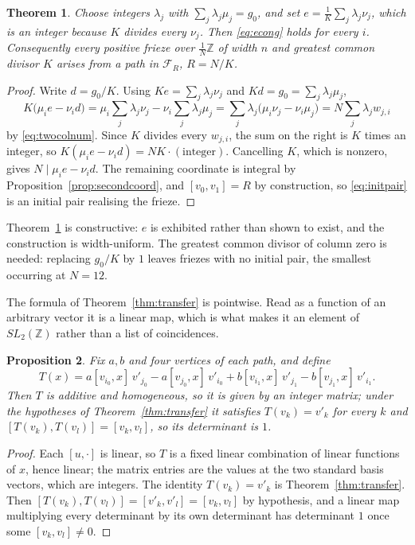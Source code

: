 \documentclass[11pt]{article}
\theoremstyle{plain}
\newtheorem{theorem}{Theorem}[section]
\newtheorem{proposition}[theorem]{Proposition}
\theoremstyle{definition}
\newcommand{\Z}{\mathbb{Z}}
\newcommand{\lat}{\tfrac{1}{N}\Z}
\begin{document}
\begin{theorem}\label{thm:initpair}
Choose integers $\lambda_j$ with $\sum_j\lambda_j\mu_j=g_0$, and set
$e=\tfrac1K\sum_j\lambda_j\nu_j$, which is an integer because $K$ divides every $\nu_j$.
Then \eqref{eq:econg} holds for every $i$. Consequently every positive frieze over $\lat$ of
width $n$ and greatest common divisor $K$ arises from a path in $\mathcal F_R$, $R=N/K$.
\end{theorem}

\begin{proof}
Write $d=g_0/K$. Using $Ke=\sum_j\lambda_j\nu_j$ and $Kd=g_0=\sum_j\lambda_j\mu_j$,
\[
  K\bigl(\mu_ie-\nu_id\bigr)
    =\mu_i\sum_j\lambda_j\nu_j-\nu_i\sum_j\lambda_j\mu_j
    =\sum_j\lambda_j\bigl(\mu_i\nu_j-\nu_i\mu_j\bigr)
    =N\sum_j\lambda_jw_{j,i}
\]
by \eqref{eq:twocolnum}. Since $K$ divides every $w_{j,i}$, the sum on the right is $K$ times
an integer, so $K(\mu_ie-\nu_id)=NK\cdot(\text{integer})$. Cancelling $K$, which is nonzero,
gives $N\mid\mu_ie-\nu_id$. The remaining coordinate is integral by
Proposition~\ref{prop:secondcoord}, and $[v_0,v_1]=R$ by construction, so
\eqref{eq:initpair} is an initial pair realising the frieze.
\end{proof}

Theorem~\ref{thm:initpair} is constructive: $e$ is exhibited rather than shown to exist, and
the construction is width-uniform. The greatest common divisor of column zero is needed:
replacing $g_0/K$ by $1$ leaves friezes with no initial pair, the smallest occurring at
$N=12$.

The formula of Theorem~\ref{thm:transfer} is pointwise. Read as a function of an arbitrary
vector it is a linear map, which is what makes it an element of $SL_2(\Z)$ rather than a
list of coincidences.

\begin{proposition}\label{prop:transferlin}
Fix $a,b$ and four vertices of each path, and define
\[
  T(x)=a[v_{i_0},x]\,v'_{j_0}-a[v_{j_0},x]\,v'_{i_0}
       +b[v_{i_1},x]\,v'_{j_1}-b[v_{j_1},x]\,v'_{i_1}.
\]
Then $T$ is additive and homogeneous, so it is given by an integer matrix; under the
hypotheses of Theorem~\ref{thm:transfer} it satisfies $T(v_k)=v'_k$ for every $k$ and
$[T(v_k),T(v_l)]=[v_k,v_l]$, so its determinant is $1$.
\end{proposition}

\begin{proof}
Each $[u,\cdot]$ is linear, so $T$ is a fixed linear combination of linear functions of $x$,
hence linear; the matrix entries are the values at the two standard basis vectors, which are
integers. The identity $T(v_k)=v'_k$ is Theorem~\ref{thm:transfer}. Then
$[T(v_k),T(v_l)]=[v'_k,v'_l]=[v_k,v_l]$ by hypothesis, and a linear map multiplying every
determinant by its own determinant has determinant $1$ once some $[v_k,v_l]\neq0$.
\end{proof}
\end{document}
